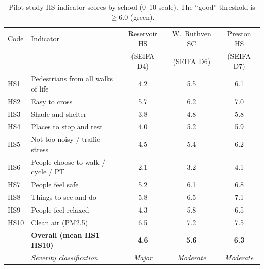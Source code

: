 \documentclass[11pt,a4paper,openany]{book}
\begin{document}
\begin{table}[ht]
\centering
\caption{Pilot study HS indicator scores by school (0--10 scale).
         The ``good'' threshold is $\ge 6.0$ (green).}
\label{tab:hs-scores}
\setlength{\tabcolsep}{5pt}
\small
\begin{tabular}{lL{4.5cm}ccc}
\toprule
Code & Indicator & Reservoir HS & W.\ Ruthven SC & Preston HS \\
     &           & (SEIFA D4)   & (SEIFA D6)     & (SEIFA D7) \\
\midrule
HS1  & Pedestrians from all walks of life
     & 4.2
     & 5.5
     & 6.1 \\
HS2  & Easy to cross
     & 5.7
     & 6.2
     & 7.0 \\
HS3  & Shade and shelter
     & 3.8
     & 4.8
     & 5.8 \\
HS4  & Places to stop and rest
     & 4.0
     & 5.2
     & 5.9 \\
HS5  & Not too noisy / traffic stress
     & 4.5
     & 5.4
     & 6.2 \\
HS6  & People choose to walk / cycle / PT
     & 2.1
     & 3.2
     & 4.1 \\
HS7  & People feel safe
     & 5.2
     & 6.1
     & 6.8 \\
HS8  & Things to see and do
     & 5.8
     & 6.5
     & 7.1 \\
HS9  & People feel relaxed
     & 4.3
     & 5.8
     & 6.5 \\
HS10 & Clean air (PM2.5)
     & 6.5
     & 7.2
     & 7.5 \\
\midrule
     & \textbf{Overall (mean HS1--HS10)}
     & \textbf{4.6}
     & \textbf{5.6}
     & \textbf{6.3} \\
     & \textit{Severity classification}
     & \textit{Major}
     & \textit{Moderate}
     & \textit{Moderate} \\
\bottomrule
\end{tabular}
\end{table}
\end{document}
